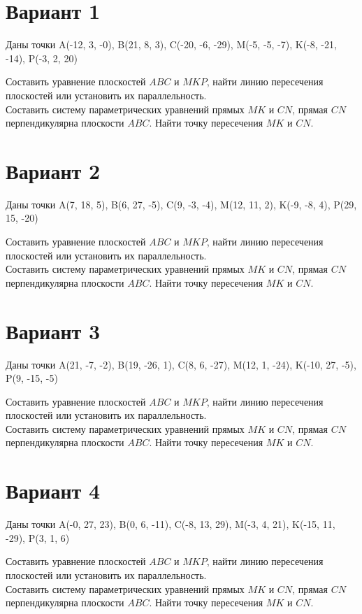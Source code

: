 \documentclass[11pt]{article}
\begin{document}
\section*{Вариант 1}
Даны точки A(-12, 3, -0), B(21, 8, 3), C(-20, -6, -29), M(-5, -5, -7), K(-8, -21, -14), P(-3, 2, 20)

Составить уравнение плоскостей $ABC$ и $MKP$, найти линию пересечения плоскостей или установить их параллельность.\\
Составить систему параметрических уравнений прямых $MK$ и $CN$, прямая $CN$ перпендикулярна плоскости $ABC$. Найти точку пересечения $MK$ и $CN$.

\section*{Вариант 2}
Даны точки A(7, 18, 5), B(6, 27, -5), C(9, -3, -4), M(12, 11, 2), K(-9, -8, 4), P(29, 15, -20)

Составить уравнение плоскостей $ABC$ и $MKP$, найти линию пересечения плоскостей или установить их параллельность.\\
Составить систему параметрических уравнений прямых $MK$ и $CN$, прямая $CN$ перпендикулярна плоскости $ABC$. Найти точку пересечения $MK$ и $CN$.

\section*{Вариант 3}
Даны точки A(21, -7, -2), B(19, -26, 1), C(8, 6, -27), M(12, 1, -24), K(-10, 27, -5), P(9, -15, -5)

Составить уравнение плоскостей $ABC$ и $MKP$, найти линию пересечения плоскостей или установить их параллельность.\\
Составить систему параметрических уравнений прямых $MK$ и $CN$, прямая $CN$ перпендикулярна плоскости $ABC$. Найти точку пересечения $MK$ и $CN$.

\section*{Вариант 4}
Даны точки A(-0, 27, 23), B(0, 6, -11), C(-8, 13, 29), M(-3, 4, 21), K(-15, 11, -29), P(3, 1, 6)

Составить уравнение плоскостей $ABC$ и $MKP$, найти линию пересечения плоскостей или установить их параллельность.\\
Составить систему параметрических уравнений прямых $MK$ и $CN$, прямая $CN$ перпендикулярна плоскости $ABC$. Найти точку пересечения $MK$ и $CN$.
\end{document}
